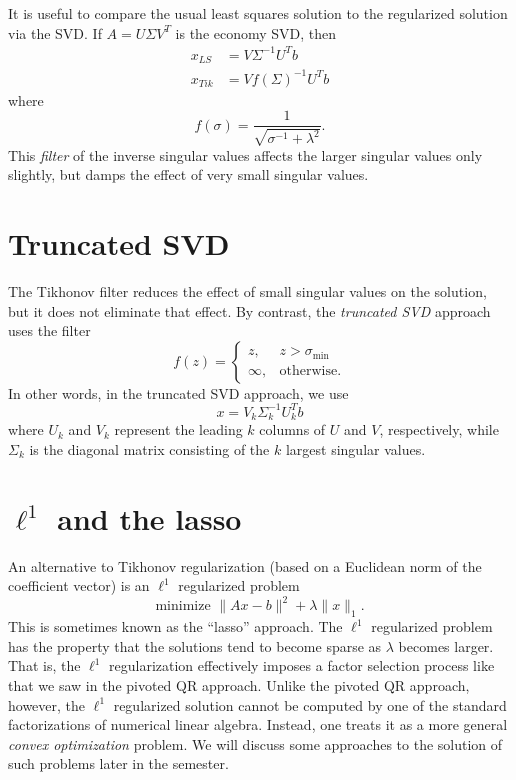 \documentclass[12pt, leqno]{article} %
\begin{document}
It is useful to compare the usual least squares solution to the
regularized solution via the SVD.  If $A = U \Sigma V^T$ is the
economy SVD, then
\begin{align*}
  x_{LS} &= V \Sigma^{-1} U^T b \\
  x_{Tik} &= V f(\Sigma)^{-1} U^T b
\end{align*}
where
\[
  f(\sigma) = \frac{1}{\sqrt{\sigma^{-1} + \lambda^2}}.
\]
This {\em filter} of the inverse singular values affects the larger
singular values only slightly, but damps the effect of very small
singular values.

\section{Truncated SVD}

The Tikhonov filter reduces the effect of small singular values on
the solution, but it does not eliminate that effect.  By contrast,
the {\em truncated SVD} approach uses the filter
\[
f(z) =
\begin{cases}
  z, & z > \sigma_{\min} \\
  \infty, & \mbox{otherwise}.
\end{cases}
\]
In other words, in the truncated SVD approach, we use
\[
  x = V_k \Sigma_k^{-1} U_k^T b
\]
where $U_k$ and $V_k$ represent the leading $k$ columns of $U$ and
$V$, respectively, while $\Sigma_k$ is the diagonal matrix consisting
of the $k$ largest singular values.

\section{$\ell^1$ and the lasso}

An alternative to Tikhonov regularization (based on a Euclidean norm
of the coefficient vector) is an $\ell^1$ regularized problem
\[
  \mbox{minimize } \|Ax-b\|^2 + \lambda \|x\|_1.
\]
This is sometimes known as the ``lasso'' approach.  The $\ell^1$
regularized problem has the property that the solutions tend to
become sparse as $\lambda$ becomes larger.  That is, the $\ell^1$
regularization effectively imposes a factor selection process like
that we saw in the pivoted QR approach.  Unlike the pivoted QR
approach, however, the $\ell^1$ regularized solution cannot be
computed by one of the standard factorizations of numerical linear
algebra.  Instead, one treats it as a more general {\em convex
  optimization} problem.  We will discuss some approaches to the
solution of such problems later in the semester.
\end{document}
